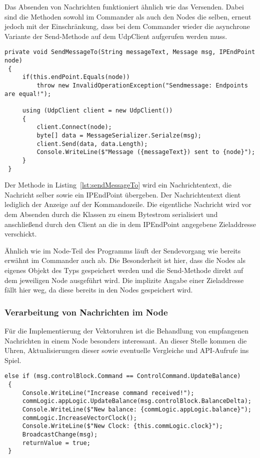 Das Absenden von Nachrichten funktioniert ähnlich wie das Versenden. Dabei sind die Methoden sowohl im Commander als auch den Nodes die selben, erneut jedoch mit der Einschränkung, dass bei dem Commander wieder die asynchrone Variante der Send-Methode auf dem UdpClient aufgerufen werden muss. 

\begin{lstlisting}[label=lst:sendMessageTo,
language=sharpc,
float=ht,
firstnumber=1,
captionpos=b,
caption=Absenden einer Nachricht in einem Node.]
 private void SendMessageTo(String messageText, Message msg, IPEndPoint node)
 {
	 if(this.endPoint.Equals(node))
		 throw new InvalidOperationException("Sendmessage: Endpoints are equal!");
		 
	 using (UdpClient client = new UdpClient())
	 {
		 client.Connect(node);
		 byte[] data = MessageSerializer.Serialze(msg);
		 client.Send(data, data.Length);
		 Console.WriteLine($"Message ({messageText}) sent to {node}");
	 }
 }
\end{lstlisting}

Der Methode  in Listing~\ref{lst:sendMessageTo} wird ein Nachrichtentext, die Nachricht selber sowie ein IPEndPoint übergeben. Der Nachrichtentext dient lediglich der Anzeige auf der Kommandozeile. Die eigentliche Nachricht wird vor dem Absenden durch die Klassen  zu einem Bytestrom serialisiert und anschließend durch den Client an die in dem IPEndPoint angegebene Zieladdresse verschickt.

Ähnlich wie im Node-Teil des Programms läuft der Sendevorgang wie bereits erwähnt im Commander auch ab. Die Besonderheit ist hier, dass die Nodes als eigenes Objekt des Typs  gespeichert werden und die Send-Methode direkt auf dem jeweiligen Node ausgeführt wird. Die implizite Angabe einer Zieladdresse fällt hier weg, da diese bereits in den Nodes gespeichert wird.
\subsubsection{Verarbeitung von Nachrichten im Node}
Für die Implementierung der Vektoruhren ist die Behandlung von empfangenen Nachrichten in einem Node besonders interessant. An dieser Stelle kommen die Uhren, Aktualisierungen dieser sowie eventuelle Vergleiche und API-Aufrufe ins Spiel. 

\begin{lstlisting}[label=lst:handleMessageIncrease,
language=sharpc,
float=ht,
firstnumber=1,
captionpos=b,
caption=Auszug aus der \code{HandleControlMessage()}-Methode. Hier wird ein UpdateBalance-Befehl verarbeitet.]
 else if (msg.controlBlock.Command == ControlCommand.UpdateBalance)
 {
	 Console.WriteLine("Increase command received!");
	 commLogic.appLogic.UpdateBalance(msg.controlBlock.BalanceDelta);
	 Console.WriteLine($"New balance: {commLogic.appLogic.balance}");
	 commLogic.IncreaseVectorClock();                                    
	 Console.WriteLine($"New Clock: {this.commLogic.clock}");
	 BroadcastChange(msg);
	 returnValue = true;
 }
\end{lstlisting}

